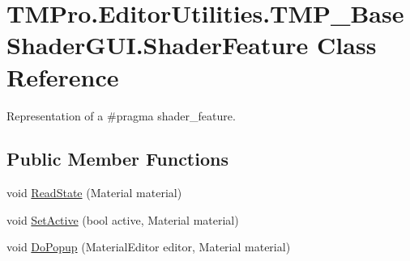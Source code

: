 \hypertarget{class_t_m_pro_1_1_editor_utilities_1_1_t_m_p___base_shader_g_u_i_1_1_shader_feature}{}\section{T\+M\+Pro.\+Editor\+Utilities.\+T\+M\+P\+\_\+\+Base\+Shader\+G\+U\+I.\+Shader\+Feature Class Reference}
\label{class_t_m_pro_1_1_editor_utilities_1_1_t_m_p___base_shader_g_u_i_1_1_shader_feature}


Representation of a \#pragma shader\+\_\+feature.  


\subsection*{Public Member Functions}
\begin{DoxyCompactItemize}
\item 
void \mbox{\hyperlink{class_t_m_pro_1_1_editor_utilities_1_1_t_m_p___base_shader_g_u_i_1_1_shader_feature_a0dca9d0fb4ddc129cd29ee4d4079c788}{Read\+State}} (Material material)
\item 
void \mbox{\hyperlink{class_t_m_pro_1_1_editor_utilities_1_1_t_m_p___base_shader_g_u_i_1_1_shader_feature_a27cd0346e0b4ec6aa5c0ffa566f94627}{Set\+Active}} (bool active, Material material)
\item 
void \mbox{\hyperlink{class_t_m_pro_1_1_editor_utilities_1_1_t_m_p___base_shader_g_u_i_1_1_shader_feature_a939172ac44e3efda12576a9572e001eb}{Do\+Popup}} (Material\+Editor editor, Material material)
\end{DoxyCompactItemize}
